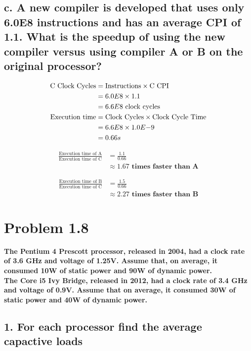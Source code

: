 \documentclass[11pt]{article}
\begin{document}
\subsection*{\small c. A new compiler is developed that uses only 6.0E8 instructions and has an average CPI of 1.1. What is the speedup of using the new compiler versus using compiler A or B on the original processor?}

\begin{align*}
\textrm{C Clock Cycles} & = \textrm{Instructions} \times \textrm{C CPI}\\
& = 6.0E8 \times 1.1\\
& = 6.6E8 \textrm{ clock cycles}\\
\textrm{Execution time} & = \textrm{Clock Cycles} \times \textmd{Clock Cycle Time}\\
& = 6.6E8 \times 1.0E{-9}\\
& = 0.66 s
\end{align*}

\begin{align*}
\frac{\textrm{Execution time of A}}{\textrm{Execution time of C}} & = \frac{1.1}{0.66}\\
& \approx \boldsymbol{1.67 \textrm{ times faster than A}}
\end{align*}

\begin{align*}
\frac{\textrm{Execution time of B}}{\textrm{Execution time of C}} & = \frac{1.5}{0.66}\\
& \approx \boldsymbol{2.27 \textrm{ times faster than B}}
\end{align*}
\section*{Problem 1.8}
\small\textbf{The Pentium 4 Prescott processor, released in 2004, had a clock rate of 3.6 GHz and voltage of 1.25V. Assume that, on average, it consumed 10W of static power and 90W of dynamic power.}\\

\noindent\textbf{The Core i5 Ivy Bridge, released in 2012, had a clock rate of 3.4 GHz and voltage of 0.9V. Assume that on average, it consumed 30W of static power and 40W of dynamic power.}

\subsection*{\small 1. For each processor find the average capactive loads}
\end{document}

